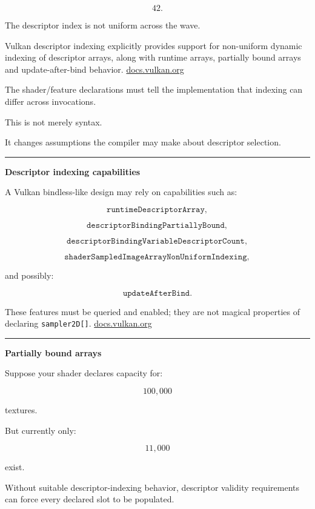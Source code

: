 \[
42.
\]

The descriptor index is not uniform across the wave.

Vulkan descriptor indexing explicitly provides support for non-uniform dynamic indexing of descriptor arrays, along with runtime arrays, partially bound arrays and update-after-bind behavior. \href{https://docs.vulkan.org/refpages/latest/refpages/source/VK_EXT_descriptor_indexing.html?utm_source=chatgpt.com}{docs.vulkan.org}

The shader/feature declarations must tell the implementation that indexing can differ across invocations.

This is not merely syntax.

It changes assumptions the compiler may make about descriptor selection.

\begin{center}\rule{0.5\linewidth}{0.5pt}\end{center}

\textbf{Descriptor indexing capabilities}

A Vulkan bindless-like design may rely on capabilities such as:

\[
\texttt{runtimeDescriptorArray},
\]

\[
\texttt{descriptorBindingPartiallyBound},
\]

\[
\texttt{descriptorBindingVariableDescriptorCount},
\]

\[
\texttt{shaderSampledImageArrayNonUniformIndexing},
\]

and possibly:

\[
\texttt{updateAfterBind}.
\]

These features must be queried and enabled; they are not magical properties of declaring \texttt{sampler2D{[}{]}}. \href{https://docs.vulkan.org/guide/latest/extensions/VK_EXT_descriptor_indexing.html?utm_source=chatgpt.com}{docs.vulkan.org}

\begin{center}\rule{0.5\linewidth}{0.5pt}\end{center}

\textbf{Partially bound arrays}

Suppose your shader declares capacity for:

\[
100,000
\]

textures.

But currently only:

\[
11,000
\]

exist.

Without suitable descriptor-indexing behavior, descriptor validity requirements can force every declared slot to be populated.


